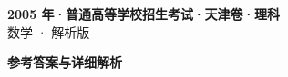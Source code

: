 \documentclass[zihao=-4, a4paper]{ctexart}
\begin{document}
\begin{center}
  {\Large\bfseries 2005 年·普通高等学校招生考试·天津卷·理科}\\[4pt]
  {\large 数学 · 解析版}
\end{center}
\medskip
{}

\clearpage
{}
\begin{center}{\Large\bfseries 参考答案与详细解析}\end{center}
\medskip

\end{document}
